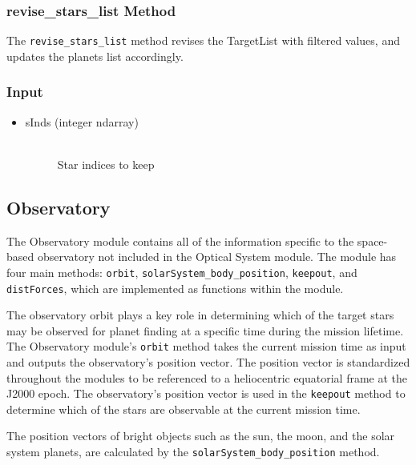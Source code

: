 \documentclass[cleanfoot]{asme2ej}
\begin{document}
\subsubsection{revise\_stars\_list Method} \label{sec:revisestarslisttask}
The \verb+revise_stars_list+ method revises the TargetList with filtered values, and updates the planets list accordingly.
\subsubsection*{Input}
\begin{itemize}
\item 
\begin{description}
    \item[sInds (integer ndarray)] \hfill \\  Star indices to keep
\end{description}
\end{itemize}



\subsection{Observatory}
The Observatory module contains all of the information specific to the space-based observatory not included in the Optical System module. The module has four main methods: \verb+orbit+, \verb+solarSystem_body_position+, \verb+keepout+, and \verb+distForces+, which are implemented as functions within the module.

The observatory orbit plays a key role in determining which of the target stars may be observed for planet finding at a specific time during the mission lifetime. The Observatory module's \verb+orbit+ method takes the current mission time as input and outputs the observatory's position vector. The position vector is standardized throughout the modules to be referenced to a heliocentric equatorial frame at the J2000 epoch. The observatory's position vector is used in the \verb+keepout+ method to determine which of the stars are observable at the current mission time.

The position vectors of bright objects such as the sun, the moon, and the solar system planets, are calculated by the \verb+solarSystem_body_position+ method. 
\end{document}
